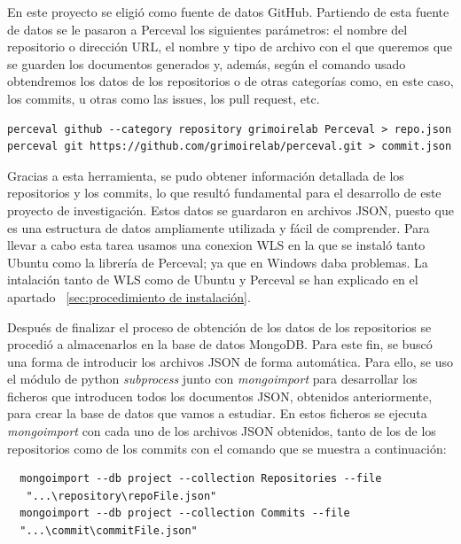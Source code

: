 \documentclass[a4paper, 12pt]{book}
\begin{document}
En este proyecto se eligió como fuente de datos GitHub. 
Partiendo de esta fuente de datos se le pasaron a Perceval los siguientes parámetros: el nombre del repositorio o dirección URL, el nombre y tipo de archivo con el que queremos que se guarden los documentos generados y, además, según el comando usado obtendremos los datos de los repositorios o de otras categorías como, en este caso, los commits, u otras como las issues, los pull request, etc.
\begin{verbatim}
perceval github --category repository grimoirelab Perceval > repo.json
perceval git https://github.com/grimoirelab/perceval.git > commit.json
\end{verbatim} 
    

Gracias a esta herramienta, se pudo obtener información detallada de los repositorios y los commits, lo que resultó fundamental para el desarrollo de este proyecto de investigación.
Estos datos se guardaron en archivos JSON, puesto que es una estructura de datos ampliamente utilizada y fácil de comprender.
Para llevar a cabo esta tarea usamos una conexion WLS en la que se instaló tanto Ubuntu como la librería de Perceval; ya que en Windows daba problemas.
La intalación tanto de WLS como de Ubuntu y Perceval se han explicado en el apartado ~\ref{sec:procedimiento de instalación}.

Después de finalizar el proceso de obtención de los datos de los repositorios se procedió a almacenarlos en la base de datos MongoDB.
Para este fin, se buscó una forma de introducir los archivos JSON de forma automática. 
Para ello, se uso el módulo de python \emph{subprocess} junto con \emph{mongoimport} para desarrollar los ficheros que introducen todos los documentos JSON, obtenidos anteriormente, para crear la base de datos que vamos a estudiar.
En estos ficheros se ejecuta \emph{mongoimport} con cada uno de los archivos JSON obtenidos, tanto de los de los repositorios como de los commits con el comando que se muestra a continuación:
\begin{verbatim}
  mongoimport --db project --collection Repositories --file
   "...\repository\repoFile.json"
  mongoimport --db project --collection Commits --file 
  "...\commit\commitFile.json"
\end{verbatim}
\end{document}
